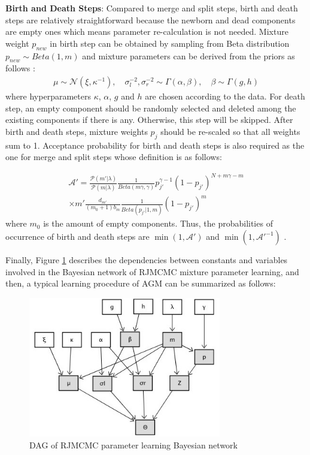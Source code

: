 \textbf{Birth and Death Steps}: Compared to merge and split steps, birth and death steps are relatively straightforward because the newborn and dead components are empty ones which means parameter re-calculation is not needed. Mixture weight $p_{new}$ in birth step can be obtained by sampling from Beta distribution $p_{new} \sim Beta(1,m)$ and mixture parameters can be derived from the priors as follows \cite{Casella2004}:
\begin{align}
\mu \sim \mathcal{N}(\xi,\kappa^{-1}), \quad \sigma_{l}^{-2},\sigma_{r}^{-2} \sim \Gamma(\alpha,\beta), \quad \beta \sim \Gamma(g,h)
\label{eq:prior}
\end{align}
where hyperparameters $\kappa$, $\alpha$, $g$ and $h$ are chosen according to the data. For death step, an empty component should be randomly selected and deleted among the existing components if there is any. Otherwise, this step will be skipped. After birth and death steps, mixture weights $p_j$ should be re-scaled so that all weights sum to 1. Acceptance probability for birth and death steps is also required as the one for merge and split steps whose definition is as follows:

\begin{multline}
\mathcal{A}'=\frac{\mathcal{P}(m'|\lambda)}{\mathcal{P}(m|\lambda)}\frac{1}{Beta(m\gamma,\gamma)}p_{j'}^{\gamma-1}(1-p_{j'})^{N+m\gamma-m} \\
\times m' \frac{d_{m'}}{(m_0+1)b_m}\frac{1}{Beta(p_{j'}|1,m)}(1-p_{j'})^m
\label{eq:acptProBD}
\end{multline}
where $m_0$ is the amount of empty components. Thus, the probabilities of occurrence of birth and death steps are $\min(1,\mathcal{A}')$ and $\min(1,\mathcal{A}'^{-1})$ \cite{Richardson1997}.

Finally, Figure \ref{fig:DAG_rjmcmc} describes the dependencies between constants and variables involved in the Bayesian network of RJMCMC mixture parameter learning, and then, a typical learning procedure of AGM can be summarized as follows:

\begin{figure}
\includegraphics[width=0.75\textwidth]{DAG_RJMCMC.jpg}
\caption{DAG of RJMCMC parameter learning Bayesian network}
\label{fig:DAG_rjmcmc}
\end{figure}

